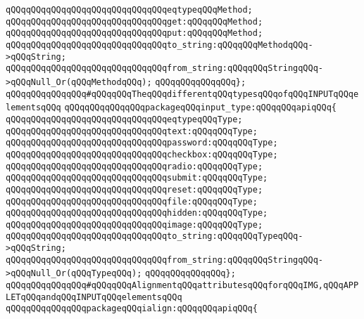\verb|qQQqqQQqqQQqqQQqqQQqqQQqqQQqqQQqeqtypeqQQqMethod;|\newline
\verb|qQQqqQQqqQQqqQQqqQQqqQQqqQQqqQQqget:qQQqqQQqMethod;|\newline
\verb|qQQqqQQqqQQqqQQqqQQqqQQqqQQqqQQqput:qQQqqQQqMethod;|\newline
\verb|qQQqqQQqqQQqqQQqqQQqqQQqqQQqqQQqto_string:qQQqqQQqMethodqQQq->qQQqString;|\newline
\verb|qQQqqQQqqQQqqQQqqQQqqQQqqQQqqQQqfrom_string:qQQqqQQqStringqQQq->qQQqNull_Or(qQQqMethodqQQq);|\newline
\verb|qQQqqQQqqQQqqQQq};|\newline
\newline
\verb|qQQqqQQqqQQqqQQq#qQQqqQQqTheqQQqdifferentqQQqtypesqQQqofqQQqINPUTqQQqelementsqQQq|\newline
\verb|qQQqqQQqqQQqqQQqpackageqQQqinput_type:qQQqqQQqapiqQQq{|\newline
\verb|qQQqqQQqqQQqqQQqqQQqqQQqqQQqqQQqeqtypeqQQqType;|\newline
\verb|qQQqqQQqqQQqqQQqqQQqqQQqqQQqqQQqtext:qQQqqQQqType;|\newline
\verb|qQQqqQQqqQQqqQQqqQQqqQQqqQQqqQQqpassword:qQQqqQQqType;|\newline
\verb|qQQqqQQqqQQqqQQqqQQqqQQqqQQqqQQqcheckbox:qQQqqQQqType;|\newline
\verb|qQQqqQQqqQQqqQQqqQQqqQQqqQQqqQQqradio:qQQqqQQqType;|\newline
\verb|qQQqqQQqqQQqqQQqqQQqqQQqqQQqqQQqsubmit:qQQqqQQqType;|\newline
\verb|qQQqqQQqqQQqqQQqqQQqqQQqqQQqqQQqreset:qQQqqQQqType;|\newline
\verb|qQQqqQQqqQQqqQQqqQQqqQQqqQQqqQQqfile:qQQqqQQqType;|\newline
\verb|qQQqqQQqqQQqqQQqqQQqqQQqqQQqqQQqhidden:qQQqqQQqType;|\newline
\verb|qQQqqQQqqQQqqQQqqQQqqQQqqQQqqQQqimage:qQQqqQQqType;|\newline
\verb|qQQqqQQqqQQqqQQqqQQqqQQqqQQqqQQqto_string:qQQqqQQqTypeqQQq->qQQqString;|\newline
\verb|qQQqqQQqqQQqqQQqqQQqqQQqqQQqqQQqfrom_string:qQQqqQQqStringqQQq->qQQqNull_Or(qQQqTypeqQQq);|\newline
\verb|qQQqqQQqqQQqqQQq};|\newline
\newline
\verb|qQQqqQQqqQQqqQQq#qQQqqQQqAlignmentqQQqattributesqQQqforqQQqIMG,qQQqAPPLETqQQqandqQQqINPUTqQQqelementsqQQq|\newline
\verb|qQQqqQQqqQQqqQQqpackageqQQqialign:qQQqqQQqapiqQQq{|\newline
